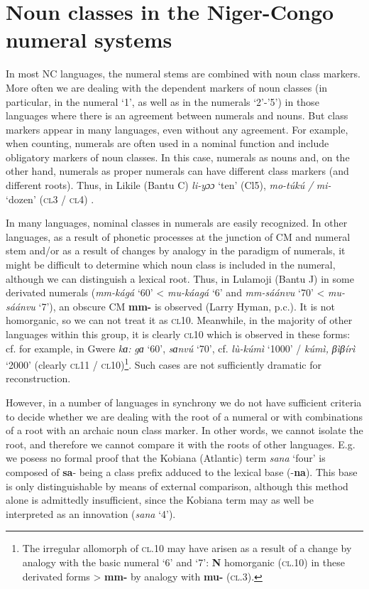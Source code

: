 \chapter{Noun classes in the Niger-Congo numeral systems} \label{sec:1}
In most NC languages, the numeral stems are combined with noun class markers. More often we are dealing with the dependent markers of noun classes (in particular, in the numeral `1', as well as in the numerals `2'-'5') in those languages where there is an agreement between numerals and nouns. But class markers appear in many languages, ​​even without any agreement. For example, when counting, numerals are often used in a nominal function and include obligatory markers of noun classes. In this case, numerals as nouns and, on the other hand, numerals as proper numerals can have different class markers (and different roots). Thus, in Likile (Bantu C) \textit{li-yɔɔ} `ten' (Cl5), \textit{mo-túkú} \textit{/} \textit{mi-} {`dozen'} (\textsc{cl}3 / \textsc{cl}4) \citep{Carrington1977}.

In many languages, nominal classes in numerals are easily recognized. In other languages, as a result of phonetic processes at the junction of CM and numeral stem and/or as a result of changes by analogy in the paradigm of numerals, it might be difficult to determine which noun class is included in the numeral, although we can distinguish a lexical root. Thus, in Lulamoji (Bantu J) in some derivated numerals (\textit{mm-kágá} `60' < \textit{mu-káagá} `6' and \textit{mm-sáánvu} `70' < \textit{mu-sáánvu} `7'), an obscure CM \textbf{mm-} is observed (Larry Hyman, p.c.). It is not homorganic, so we can not treat it as \textsc{cl}10. Meanwhile, in the majority of other languages within this group, it is clearly \textsc{cl}10 which is observed in these forms: cf. for example, in Gwere \textit{{}kɑ:} \textit{gɑ} `60', \textit{{}sɑnvú} `70', cf. \textit{lù-kúmì} `1000' / \textit{{}kúmì, } \textit{βìβírì} `2000' (clearly \textsc{cl}11 / \textsc{cl}10)\footnote{The irregular allomorph of \textsc{cl}.10 may have arisen as a result of a change by analogy with the basic numeral `6' and `7': \textbf{N} homorganic (\textsc{cl}.10) in these derivated forms > \textbf{mm-} by analogy with \textbf{mu-} (\textsc{cl}.3).}. Such cases are not sufficiently dramatic for reconstruction.

However, in a number of languages in synchrony we do not have sufficient criteria to decide whether we are dealing with the root of a numeral or with combinations of a root with an archaic noun class marker. In other words, we cannot isolate the root, and therefore we cannot compare it with the roots of other languages. E.g. we posess no formal proof that the Kobiana (Atlantic) term \textit{sana} ‘four’ is composed of \textbf{sa}- being a class prefix adduced to the lexical base (-\textbf{na}). This base is only distinguishable by means of external comparison, although this method alone is admittedly  insufficient, since the Kobiana term may as well be interpreted as an innovation (\textit{sana} ‘4’). 

